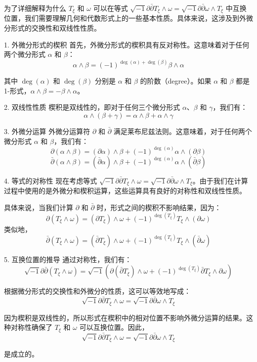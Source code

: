 \begin{remark}
    为了详细解释为什么 \(T_\xi\) 和 \(\omega\) 可以在等式 \(\sqrt{-1}\partial\bar{\partial} T_\xi \wedge \omega = \sqrt{-1}\partial\bar{\partial} \omega \wedge T_\xi\) 中互换位置，我们需要理解几何和代数形式上的一些基本性质。具体来说，这涉及到外微分形式的交换性和双线性性质。

1. 外微分形式的楔积
首先，外微分形式的楔积具有反对称性。这意味着对于任何两个微分形式 \(\alpha\) 和 \(\beta\)：
\[
\alpha \wedge \beta = (-1)^{\deg(\alpha) +\deg(\beta)} \beta \wedge \alpha
\]

其中 \(\deg(\alpha)\) 和 \(\deg(\beta)\) 分别是 \(\alpha\) 和 \(\beta\) 的阶数（degree）。如果 \(\alpha\) 和 \(\beta\) 都是 1-形式，\(\alpha \wedge \beta = -\beta \wedge \alpha\)。

2. 双线性性质
楔积是双线性的，即对于任何三个微分形式 \(\alpha\)、\(\beta\) 和 \(\gamma\)，我们有：
\[
\alpha \wedge (\beta + \gamma) = \alpha \wedge \beta + \alpha \wedge \gamma
\]

3. 外微分运算
外微分运算符 \(\partial\) 和 \(\bar{\partial}\) 满足莱布尼兹法则。这意味着，对于任何两个微分形式 \(\alpha\) 和 \(\beta\)，我们有：
\[
\partial(\alpha \wedge \beta) = (\partial \alpha) \wedge \beta + (-1)^{\deg(\alpha)} \alpha \wedge (\partial \beta)
\]
\[
\bar{\partial}(\alpha \wedge \beta) = (\bar{\partial} \alpha) \wedge \beta + (-1)^{\deg(\alpha)} \alpha \wedge (\bar{\partial} \beta)
\]

4. 等式的对称性
现在考虑等式 \(\sqrt{-1}\partial\bar{\partial} T_\xi \wedge \omega = \sqrt{-1}\partial\bar{\partial} \omega \wedge T_\xi\)。由于我们在计算过程中使用的是外微分和楔积运算，这些运算具有良好的对称性和双线性性质。

具体来说，当我们计算 \(\partial\) 和 \(\bar{\partial}\) 时，形式之间的楔积不影响结果，因为：
\[
\partial(T_\xi \wedge \omega) = (\partial T_\xi) \wedge \omega + (-1)^{\deg(T_\xi)} T_\xi \wedge (\partial \omega)
\]
类似地，
\[
\bar{\partial}(T_\xi \wedge \omega) = (\bar{\partial} T_\xi) \wedge \omega + (-1)^{\deg(T_\xi)} T_\xi \wedge (\bar{\partial} \omega)
\]

5. 互换位置的推导
通过对称性，我们有：
\[
\sqrt{-1} \partial \bar{\partial} (T_\xi \wedge \omega) = \sqrt{-1} (\partial (\bar{\partial} T_\xi) \wedge \omega + (-1)^{\deg(T_\xi)} \bar{\partial} T_\xi \wedge \partial \omega)
\]

根据微分形式的交换性和外微分的性质，这可以等效地写成：
\[
\sqrt{-1} \partial \bar{\partial} T_\xi \wedge \omega = \sqrt{-1} \partial \bar{\partial} \omega \wedge T_\xi
\]

因为楔积是双线性的，所以形式在楔积中的相对位置不影响外微分运算的结果。这种对称性确保了 \(T_\xi\) 和 \(\omega\) 可以互换位置。因此，
\[
\sqrt{-1}\partial\bar{\partial} T_\xi \wedge \omega = \sqrt{-1}\partial\bar{\partial} \omega \wedge T_\xi
\]

是成立的。
\end{remark}


